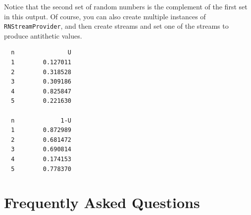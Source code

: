 \documentclass[
]{book}
\theoremstyle{definition}
\theoremstyle{definition}
\theoremstyle{definition}
\theoremstyle{definition}
\theoremstyle{remark}
\begin{document}
Notice that the second set of random numbers is the complement of the first set in this output. Of course, you can also create multiple instances of \texttt{RNStreamProvider}, and then create streams and set one of the streams to produce antithetic values.

\begin{verbatim}
  n               U 
  1        0.127011 
  2        0.318528 
  3        0.309186 
  4        0.825847 
  5        0.221630
  
  n             1-U 
  1        0.872989 
  2        0.681472 
  3        0.690814 
  4        0.174153 
  5        0.778370
\end{verbatim}

\hypertarget{ch2:FAQ}{%
\section{Frequently Asked Questions}\label{ch2:FAQ}}
\end{document}

